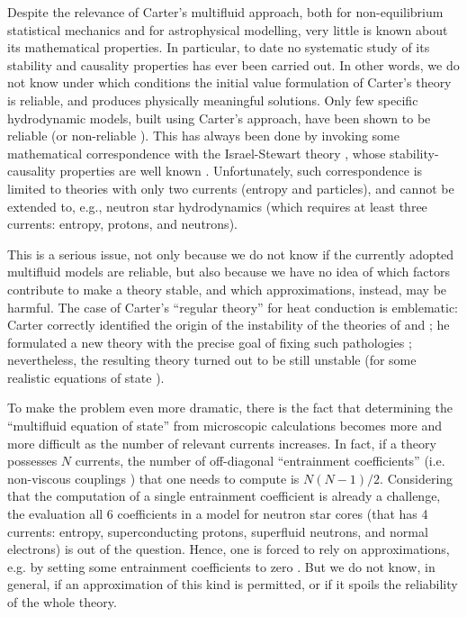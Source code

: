 \documentclass[a4paper, amsfonts, amssymb, amsmath, reprint, showkeys, nofootinbib, twoside, onecolumn,notitlepage]{revtex4-1}
\theoremstyle{definition}
\theoremstyle{theorem}
\begin{document}
Despite the relevance of Carter's multifluid approach, both for non-equilibrium statistical mechanics and for astrophysical modelling, very little is known about its mathematical properties. In particular, to date no systematic study of its stability and causality properties has ever been carried out. In other words, we do not know under which conditions the initial value formulation of Carter's theory is reliable, and produces physically meaningful solutions. Only few specific hydrodynamic models, built using Carter's approach, have been shown to be reliable (or non-reliable \cite{OlsonRegularCarter1990}). This has always been done by invoking some mathematical correspondence \cite{PriouCOMPAR1991} with the Israel-Stewart theory \cite{Israel_Stewart_1979}, whose stability-causality properties are well known \cite{Hishcock1983}. Unfortunately, such correspondence is limited to theories with only two currents (entropy and particles), and cannot be extended to, e.g., neutron star hydrodynamics (which requires at least three currents: entropy, protons, and neutrons).

This is a serious issue, not only because we do not know if the currently adopted multifluid models are reliable, but also because we have no idea of which factors contribute to make a theory stable, and which approximations, instead, may be harmful. The case of Carter's ``regular theory'' for heat conduction is emblematic: Carter correctly identified the origin of the instability of the theories of \citet{Eckart40} and \citet{landau6}; he formulated a new theory with the precise goal of fixing such pathologies \cite{noto_rel}; nevertheless, the resulting theory turned out to be still unstable (for some realistic equations of state \cite{OlsonRegularCarter1990}). 

To make the problem even more dramatic, there is the fact that determining the ``multifluid equation of state'' from microscopic calculations becomes more and more difficult as the number of relevant currents increases. In fact, if a theory possesses $N$ currents, the number of off-diagonal ``entrainment coefficients'' (i.e. non-viscous couplings \cite{prix2004}) that one needs to compute is $N(N-1)/2$.
Considering that the computation of a single entrainment coefficient is already a challenge, the evaluation all 6 coefficients in a model for neutron star cores (that has 4 currents: entropy, superconducting protons, superfluid neutrons, and normal electrons) is out of the question. Hence, one is forced to rely on approximations, e.g. by setting some entrainment coefficients to zero \cite{GavassinoKhalatnikov2021}. But we do not know, in general, if an approximation of this kind is permitted, or if it spoils the reliability of the whole theory.
\end{document}
